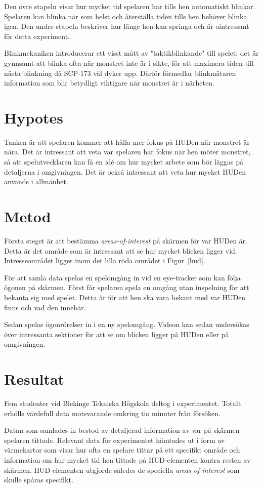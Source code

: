 \documentclass{article}
\begin{document}
Den övre stapeln visar hur mycket tid spelaren har tills hen automatiskt blinkar. Spelaren kan blinka när som helst och återställa tiden tills hen behöver blinka igen.  Den undre stapeln beskriver hur länge hen kan springa och är ointressant för detta experiment.

Blinkmekaniken introducerar ett visst mått av "taktikblinkande" till spelet; det är gynnsamt att blinka ofta när monstret inte är i sikte, för att maximera tiden till nästa blinkning då SCP-173 väl dyker upp. Därför förmedlar blinkmätaren information som blir betydligt viktigare när monstret är i närheten.


\section{Hypotes}
Tanken är att spelaren kommer att hålla mer fokus på HUDen när monstret är nära. Det är intressant att veta var spelaren har fokus när hen möter monstret, så att spelutvecklaren kan få en idé om hur mycket arbete som bör läggas på detaljerna i omgivningen. Det är också intressant att veta hur mycket HUDen används i allmänhet.

\section{Metod}
Första steget är att bestämma \textit{areas-of-interest} på skärmen för var HUDen är. Detta är det område som är intressant att se hur mycket blicken ligger vid. Intresseområdet ligger inom det lilla röda området i Figur~\ref{hud}.

För att samla data spelas en spelomgång in vid en eye-tracker som kan följa ögonen på skärmen. Först får spelaren spela en omgång utan inspelning för att bekanta sig med spelet. Detta är för att hen ska vara bekant med var HUDen finns och vad den innebär. 

Sedan spelas ögonrörelser in i en ny spelomgång. Videon kan sedan undersökas över intressanta sektioner för att se om blicken ligger på HUDen eller på omgivningen.

\section{Resultat}

Fem studenter vid Blekinge Tekniska Högskola deltog i experimentet. Totalt erhölls värdefull data motsvarande omkring tio minuter från försöken.

Datan som samlades in bestod av detaljerad information av var på skärmen spelaren tittade. Relevant data för experimentet hämtades ut i form av värmekartor som visar hur ofta en spelare tittar på ett specifikt område och information om hur mycket tid hen tittade på HUD-elementen kontra resten av skärmen. HUD-elementen utgjorde således de speciella \textit{areas-of-interest} som skulle spåras specifikt.
\end{document}

